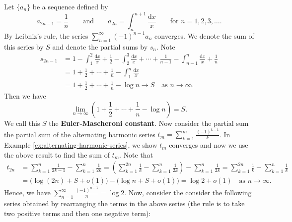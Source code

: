     \begin{exampleenv}
        Let \(\{a_n\}\) be a sequence defined by
        \[
        a_{2n-1}=\frac{1}{n}
        \qquad\text{and}\qquad
        a_{2n}=\int_n^{n+1}\frac{\mathrm{d}x}{x}
        \qquad
        \text{for } n=1,2,3,\dots.
        \]
        By Leibniz's rule, the series $\displaystyle \sum_{n=1}^{\infty}(-1)^{n-1}a_n$ converges. We denote the sum of this series by \(S\) and denote the partial sums by \(s_n\). Note \[
        \begin{aligned}
        s_{2n-1}
        &=
        1-\int_1^2\frac{\mathrm{d}x}{x}
        +\frac{1}{2}
        -\int_2^3\frac{\mathrm{d}x}{x}
        +\cdots
        +\frac{1}{n-1}
        -\int_{n-1}^{n}\frac{\mathrm{d}x}{x}
        +\frac{1}{n} \\
        &=
        1+\frac{1}{2}+\cdots+\frac{1}{n}
        -\int_1^n\frac{\mathrm{d}x}{x} \\
        &=
        1+\frac{1}{2}+\cdots+\frac{1}{n}
        -\log n \to S \quad \text{as } n\to \infty.
        \end{aligned}
        \]
        Then we have
        $$
        \lim_{n\to\infty}
        \left(
        1+\frac{1}{2}+\cdots+\frac{1}{n}-\log n
        \right)
        =
        S.
        $$
        We call this $S$ the \textbf{Euler-Mascheroni constant}. Now consider the partial sum the partial sum of the alternating harmonic series $\displaystyle t_m=\sum_{k=1}^{m}\frac{(-1)^{k-1}}{k}$. In Example \ref{ex:alternating-harmonic-series}, we show $t_m$ converges and now we use the above result to find the sum of $t_m$. Note that
        \[
        \begin{aligned}
        t_{2n}
        &=
        \sum_{k=1}^{n}\frac{1}{2k-1}
        -
        \sum_{k=1}^{n}\frac{1}{2k}
        =
        \left(
        \sum_{k=1}^{2n}\frac{1}{k}
        -
        \sum_{k=1}^{n}\frac{1}{2k}
        \right)
        -
        \sum_{k=1}^{n}\frac{1}{2k} 
        =
        \sum_{k=1}^{2n}\frac{1}{k}
        -
        \sum_{k=1}^{n}\frac{1}{k}\\
        &=
        \bigl(\log(2n)+S+o(1)\bigr)
        -
        \bigl(\log n+S+o(1)\bigr)
        =
        \log 2+o(1) \quad \text{as } n\to \infty.
        \end{aligned}
        \]
        Hence, we have $\displaystyle \sum_{n=1}^\infty \frac{(-1)^{n-1}}{n} = \log 2$. Now, consider the consider the following series obtained by rearranging the terms in the above series (the rule is to take two positive terms and then one negative term):

\end{exampleenv}
